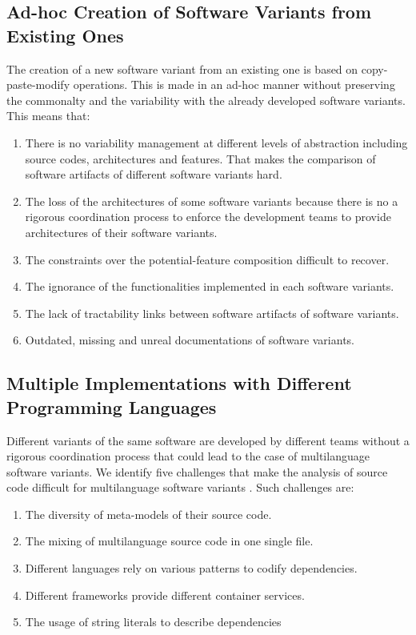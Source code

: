 \documentclass[graybox]{svmult}
\begin{document}
\subsection{Ad-hoc Creation of Software Variants from Existing Ones}
The creation of a new software variant from an existing one is based on copy-paste-modify operations. This is made in an ad-hoc manner without preserving the commonalty and the variability with the already developed software variants. This means that:
\begin{enumerate}
\item There is no variability management at different levels of abstraction including source codes, architectures and features. That makes the comparison of software artifacts of different software variants hard.

\item The loss of the architectures of some software variants because there is no a rigorous coordination process to enforce the development teams to provide architectures of their software variants.

\item  The constraints over the potential-feature composition difficult to recover.

\item  The ignorance of the functionalities implemented in each software variants.

\item  The lack of tractability links between software artifacts of software variants.

\item  Outdated, missing and unreal documentations of software variants.

\end{enumerate}

 
\subsection{Multiple Implementations with Different Programming Languages}

Different variants of the same software are developed by different teams without a rigorous coordination process that could lead to the case of multilanguage software variants. We identify five challenges that make the analysis of source code difficult for multilanguage software variants \cite{shatnawi2017analyzing}. Such challenges are:
\begin{enumerate}
\item The diversity of meta-models of their source code.
\item The mixing of multilanguage source code in one single file.
\item Different languages rely on various patterns to codify dependencies.
\item Different frameworks provide different container services.
\item  The usage of string literals to describe dependencies
\end{enumerate}
\end{document}
